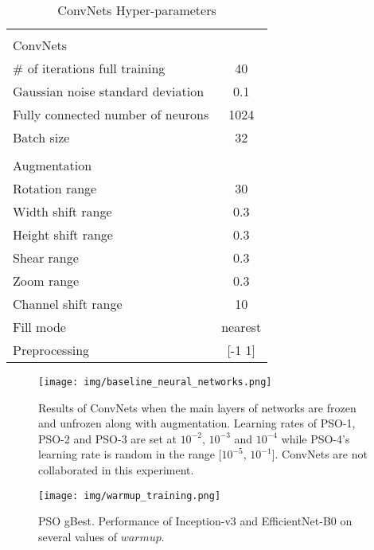 \documentclass{ieeeaccess}
\begin{document}
\begin{table}[htb!]
\centering
\caption{\label{tab:table_parameters}ConvNets Hyper-parameters}
\begin{tabular}{lc} 
\hline
& \multicolumn{1}{l}{}         \\
ConvNets                 &                              \\
\# of iterations full training    & 40                           \\
Gaussian noise standard deviation & 0.1                          \\
Fully connected number of neurons & 1024                         \\
Batch size                        & 32                           \\
                                  & \multicolumn{1}{l}{}         \\
Augmentation                      & \multicolumn{1}{l}{}         \\
Rotation range                    & 30                           \\
Width shift range                 & 0.3                          \\
Height shift range                & 0.3                          \\
Shear range                       & 0.3                          \\
Zoom range                        & 0.3                          \\
Channel shift range               & 10                           \\
Fill mode                         & \multicolumn{1}{l}{nearest}  \\
Preprocessing                     & {[}-1 1]                     \\
\hline
\end{tabular}
\end{table} \begin{figure*}[htb!]
\centering
\texttt{[image: img/baseline\_neural\_networks.png]}
\caption{Results of ConvNets when the main layers of networks are frozen and unfrozen along with augmentation. Learning rates of PSO-1, PSO-2 and PSO-3 are set at $10^{-2}$, $10^{-3}$ and $10^{-4}$ while PSO-4's learning rate is random in the range [$10^{-5}$, $10^{-1}$]. ConvNets are not collaborated in this experiment.}
\label{fig:baseline_neural_networks}
\end{figure*}
\begin{figure*}[htb!]
\begin{center}
\texttt{[image: img/warmup\_training.png]}
\caption{PSO gBest. Performance of Inception-v3 and EfficientNet-B0 on several values of $warmup$.}
\label{fig:baseline_pso}
\end{center}
\end{figure*}
\end{document}
